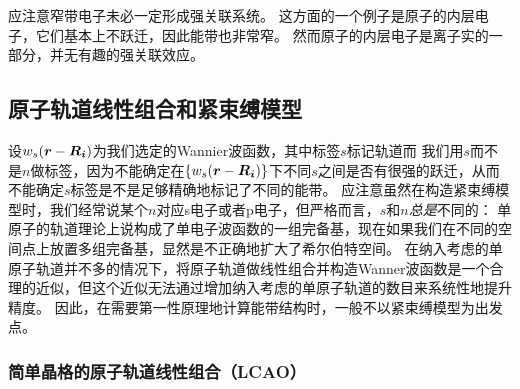 应注意窄带电子未必一定形成强关联系统。
这方面的一个例子是原子的内层电子，它们基本上不跃迁，因此能带也非常窄。
然而原子的内层电子是离子实的一部分，并无有趣的强关联效应。

\subsection{原子轨道线性组合和紧束缚模型}\label{sec:tight-binding-hopping}

设$w_{s}(\vb*{r} - \vb*{R}_{\vb*{i}})$为我们选定的Wannier波函数，其中标签$s$标记轨道而
我们用$s$而不是$n$做标签，因为不能确定在$\{w_{s}(\vb*{r} - \vb*{R}_{\vb*{i}})\}$下不同$s$之间是否有很强的跃迁，从而不能确定$s$标签是不是足够精确地标记了不同的能带。
应注意虽然在构造紧束缚模型时，我们经常说某个$n$对应s电子或者p电子，但严格而言，$s$和$n$\emph{总是}不同的：
单原子的轨道理论上说构成了单电子波函数的一组完备基，现在如果我们在不同的空间点上放置多组完备基，显然是不正确地扩大了希尔伯特空间。
在纳入考虑的单原子轨道并不多的情况下，将原子轨道做线性组合并构造Wanner波函数是一个合理的近似，但这个近似无法通过增加纳入考虑的单原子轨道的数目来系统性地提升精度。
因此，在需要第一性原理地计算能带结构时，一般不以紧束缚模型为出发点。

\subsubsection{简单晶格的原子轨道线性组合（LCAO）} 

